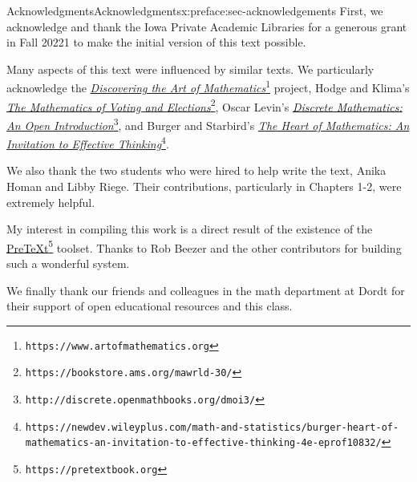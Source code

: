 \documentclass[oneside,10pt,]{book}
\numberwithin{equation}{section}
\begin{document}
\begin{preface}{Acknowledgments}{}{Acknowledgments}{}{}{x:preface:sec-acknowledgements}
First, we acknowledge and thank the Iowa Private Academic Libraries for a generous grant in Fall 20221 to make the initial version of this text possible.%
\par
Many aspects of this text were influenced by similar texts. We particularly acknowledge the \href{https://www.artofmathematics.org}{\emph{Discovering the Art of Mathematics}}\footnote{\nolinkurl{https://www.artofmathematics.org}\label{g:fn:idp105544742321424}} project, Hodge and Klima's \href{https://bookstore.ams.org/mawrld-30/}{\emph{The Mathematics of Voting and Elections}}\footnote{\nolinkurl{https://bookstore.ams.org/mawrld-30/}\label{g:fn:idp105544742322320}}, Oscar Levin's \href{http://discrete.openmathbooks.org/dmoi3/}{\emph{Discrete Mathematics: An Open Introduction}}\footnote{\nolinkurl{http://discrete.openmathbooks.org/dmoi3/}\label{g:fn:idp105544742323216}}, and Burger and Starbird's \href{https://newdev.wileyplus.com/math-and-statistics/burger-heart-of-mathematics-an-invitation-to-effective-thinking-4e-eprof10832/}{\emph{The Heart of Mathematics: An Invitation to Effective Thinking}}\footnote{\nolinkurl{https://newdev.wileyplus.com/math-and-statistics/burger-heart-of-mathematics-an-invitation-to-effective-thinking-4e-eprof10832/}\label{g:fn:idp105544742324240}}.%
\par
We also thank the two students who were hired to help write the text, Anika Homan and Libby Riege. Their contributions, particularly in Chapters 1-2, were extremely helpful.%
\par
My interest in compiling this work is a direct result of the existence of the \href{https://pretextbook.org}{PreTeXt}\footnote{\nolinkurl{https://pretextbook.org}\label{g:fn:idp105544742325648}} toolset. Thanks to Rob Beezer and the other contributors for building such a wonderful system.%
\par
We finally thank our friends and colleagues in the math department at Dordt for their support of open educational resources and this class.%
\end{preface}
\setcounter{tocdepth}{0}
\renewcommand*\contentsname{Contents}
\tableofcontents
\mainmatter
%
%
\typeout{************************************************}
\typeout{************************************************}
%
\end{document}
